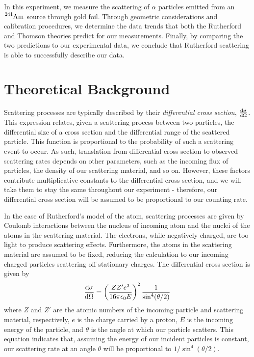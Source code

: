 In this experiment, we measure the scattering of $\alpha$ particles emitted from an $\tensor*[^{241}]{\text{Am}}{}$ source through gold foil. Through geometric considerations and calibration procedures, we determine the data trends that both the Rutherford and Thomson theories predict for our measurements. Finally, by comparing the two predictions to our experimental data, we conclude that Rutherford scattering is able to successfully describe our data.

\section{Theoretical Background}
Scattering processes are typically described by their \textit{differential cross section}, $\dv{\sigma}{\Omega}$. This expression relates, given a scattering process between two particles, the differential size of a cross section and the differential range of the scattered particle. This function is proportional to the probability of such a scattering event to occur. As such, translation from differential cross section to observed scattering rates depends on other parameters, such as the incoming flux of particles, the density of our scattering material, and so on. However, these factors contribute multiplicative constants to the differential cross section, and we will take them to stay the same throughout our experiment - therefore, our differential cross section will be assumed to be proportional to our counting rate.

In the case of Rutherford's model of the atom, scattering processes are given by Coulomb interactions between the nucleus of incoming atom and the nuclei of the atoms in the scattering material. The electrons, while negatively charged, are too light to produce scattering effects. Furthermore, the atoms in the scattering material are assumed to be fixed, reducing the calculation to our incoming charged particles scattering off stationary charges. The differential cross section is given by
\begin{equation}
  \dv{\sigma}{\Omega} = \left(\frac{Z Z' e^2}{16 \pi \epsilon_0 E}\right)^2 \frac{1}{\sin^4(\theta/2)}
  \label{rutheq}
\end{equation}
where $Z$ and $Z'$ are the atomic numbers of the incoming particle and scattering material, respectively, $e$ is the charge carried by a proton, $E$ is the incoming energy of the particle, and $\theta$ is the angle at which our particle scatters. This equation indicates that, assuming the energy of our incident particles is constant, our scattering rate at an angle $\theta$ will be proportional to $1/\sin^4(\theta/2)$.


